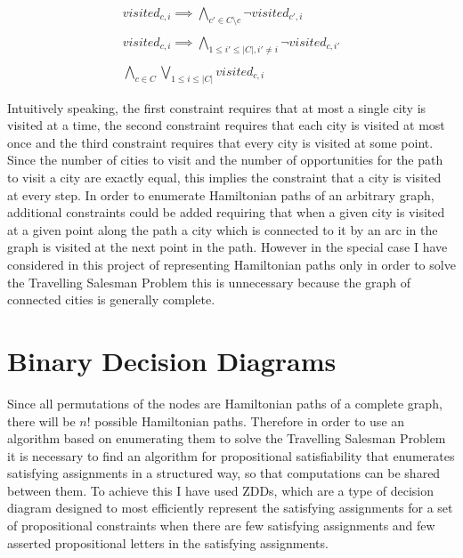 \documentclass[12pt,a4paper,twoside,openright]{report}
\begin{document}
\begin{gather*}
visited_{c,i}\implies\bigwedge_{c'\in C\setminus c}\neg visited_{c',i} \\ \\
visited_{c,i}\implies\bigwedge_{1\leq i'\leq |C|,i'\neq i}\neg visited_{c,i'} \\ \\
\bigwedge_{c\in C}\bigvee_{1\leq i\leq |C|} visited_{c,i}
\end{gather*}

Intuitively speaking, the first constraint requires that at most a single city is visited at a time, the second constraint requires that each city is visited at most once and the third constraint requires that every city is visited at some point. Since the number of cities to visit and the number of opportunities for the path to visit a city are exactly equal, this implies the constraint that a city is visited at every step. In order to enumerate Hamiltonian paths of an arbitrary graph, additional constraints could be added requiring that when a given city is visited at a given point along the path a city which is connected to it by an arc in the graph is visited at the next point in the path. However in the special case I have considered in this project of representing Hamiltonian paths only in order to solve the Travelling Salesman Problem this is unnecessary because the graph of connected cities is generally complete.

\section{Binary Decision Diagrams}
Since all permutations of the nodes are Hamiltonian paths of a complete graph, there will be $n!$ possible Hamiltonian paths. Therefore in order to use an algorithm based on enumerating them to solve the Travelling Salesman Problem it is necessary to find an algorithm for propositional satisfiability that enumerates satisfying assignments in a structured way, so that computations can be shared between them. To achieve this I have used ZDDs, which are a type of decision diagram designed to most efficiently represent the satisfying assignments for a set of propositional constraints when there are few satisfying assignments and few asserted propositional letters in the satisfying assignments.
\end{document}
